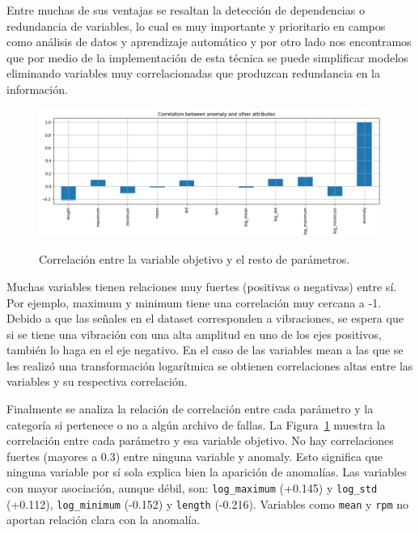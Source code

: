 \documentclass[11pt,a4paper,spanish]{book}
\numberwithin{equation}{chapter}
\numberwithin{figure}{chapter}
\begin{document}
Entre muchas de sus ventajas se resaltan la detección de dependencias o redundancia de 
variables, lo cual es muy importante y prioritario en campos como análisis de datos y 
aprendizaje automático y por otro lado nos encontramos que por medio de la implementación
de esta técnica se puede simplificar modelos eliminando variables muy correlacionadas que 
produzcan redundancia en la información. \cite{Alvarez2023}


\begin{figure}[h]
    \caption{Correlación entre la variable objetivo y el resto de parámetros.}
    \centering
    \includegraphics[width=1\textwidth]{media/dataset/corr-mat-target.png}
    \label{fig:figCorrMatTarget}
\end{figure}



Muchas variables tienen relaciones muy fuertes (positivas o negativas) entre sí. 
Por ejemplo,  maximum y minimum tiene una correlación muy cercana a -1. 
Debido a que las señales en el dataset corresponden a vibraciones, se espera que si se 
tiene una vibración con una alta amplitud en uno de los ejes positivos, 
también lo haga en el eje negativo. En el caso de las variables mean a las que se les 
realizó una transformación logarítmica se obtienen correlaciones altas entre 
las variables y su respectiva correlación. 


Finalmente se analiza la relación de correlación entre cada parámetro y la categoría si 
pertenece o no a algún archivo de fallas. La Figura~\ref{fig:figCorrMatTarget} muestra 
la correlación entre cada parámetro y esa variable objetivo. No hay correlaciones fuertes
(mayores a 0.3) entre ninguna variable y anomaly. 
Esto significa que ninguna variable por sí sola explica bien la aparición de anomalías. 
Las variables con mayor asociación, aunque débil, son: \lstinline|log_maximum| (+0.145) y 
\lstinline|log_std| (+0.112), \lstinline|log_minimum| (-0.152) y \lstinline|length| (-0.216).
Variables como \lstinline|mean| y \lstinline|rpm| no aportan relación clara con la anomalía.
\end{document}

